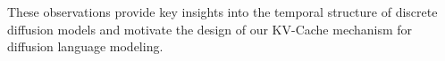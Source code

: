 \documentclass{article}
\newcommand{\bk}{\mathbf{K}}
\newcommand{\bv}{\mathbf{V}}
\begin{document}
These observations provide key insights into the temporal structure of discrete diffusion models and motivate the design of our KV-Cache mechanism for diffusion language modeling.

\end{document}

